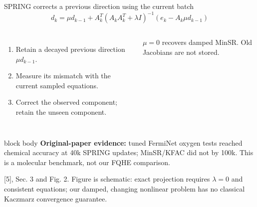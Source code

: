 \documentclass[aspectratio=169,10pt]{beamer}
\newcommand{\src}[1]{\vfill{\fontsize{6.3}{7.5}\selectfont\color{muted}#1\par}}
\begin{document}
\begin{frame}{SPRING corrects a previous direction using the current batch}
\[
\boxed{d_k=\mu d_{k-1}+A_k^T(A_kA_k^T+\lambda I)^{-1}
\left(e_k-A_k\mu d_{k-1}\right)}
\]
\begin{columns}[T,onlytextwidth]
\begin{enumerate}\setlength\itemsep{6pt}
\item Retain a decayed previous direction $\mu d_{k-1}$.
\item Measure its mismatch with the current sampled equations.
\item Correct the observed component; retain the unseen component.
\end{enumerate}
\small $\mu=0$ recovers damped MinSR. Old Jacobians are not stored.
\end{columns}
\begin{beamercolorbox}[sep=1.5mm,wd=\textwidth]{block body}\small
\textbf{Original-paper evidence:} tuned FermiNet oxygen tests reached chemical accuracy at 40k SPRING updates; MinSR/KFAC did not by 100k. This is a molecular benchmark, not our FQHE comparison.
\end{beamercolorbox}
\src{[5], Sec. 3 and Fig. 2. Figure is schematic: exact projection requires $\lambda=0$ and consistent equations; our damped, changing nonlinear problem has no classical Kaczmarz convergence guarantee.}
\end{frame}
\end{document}
